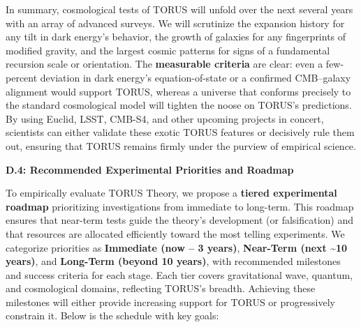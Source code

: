 \documentclass[]{article}
\begin{document}
In summary, cosmological tests of TORUS will unfold over the next
several years with an array of advanced surveys. We will scrutinize the
expansion history for any tilt in dark energy's behavior, the growth of
galaxies for any fingerprints of modified gravity, and the largest
cosmic patterns for signs of a fundamental recursion scale or
orientation. The \textbf{measurable criteria} are clear: even a
few-percent deviation in dark energy's equation-of-state or a confirmed
CMB--galaxy alignment would support TORUS, whereas a universe that
conforms precisely to the standard cosmological model will tighten the
noose on TORUS's predictions. By using Euclid, LSST, CMB-S4, and other
upcoming projects in concert, scientists can either validate these
exotic TORUS features or decisively rule them out, ensuring that TORUS
remains firmly under the purview of empirical science.

\textbf{D.4: Recommended Experimental Priorities and Roadmap}

To empirically evaluate TORUS Theory, we propose a \textbf{tiered
experimental roadmap} prioritizing investigations from immediate to
long-term. This roadmap ensures that near-term tests guide the theory's
development (or falsification) and that resources are allocated
efficiently toward the most telling experiments. We categorize
priorities as \textbf{Immediate (now -- 3 years)}, \textbf{Near-Term
(next \textasciitilde{}10 years)}, and \textbf{Long-Term (beyond 10
years)}, with recommended milestones and success criteria for each
stage. Each tier covers gravitational wave, quantum, and cosmological
domains, reflecting TORUS's breadth. Achieving these milestones will
either provide increasing support for TORUS or progressively constrain
it. Below is the schedule with key goals:
\end{document}

